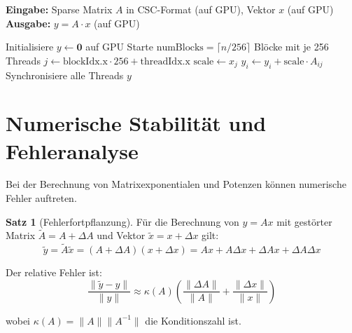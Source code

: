 ﻿\documentclass[a4paper,12pt]{report}
\theoremstyle{definition}
\newtheorem{satz}{Satz}
\begin{document}
	\begin{algorithm}[H]
		\caption{GPU-beschleunigte sparse Matrix-Vektor-Multiplikation}
		\label{alg:gpu-sparse-matvec}
		\textbf{Eingabe:} Sparse Matrix $A$ in CSC-Format (auf GPU), Vektor $x$ (auf GPU) \\
		\textbf{Ausgabe:} $y = A \cdot x$ (auf GPU)
		\begin{algorithmic}[1]
			\State Initialisiere $y \gets \mathbf{0}$ auf GPU
			\State Starte $\text{numBlocks} = \lceil n / 256 \rceil$ Blöcke mit je 256 Threads
			\State $j \gets \text{blockIdx.x} \cdot 256 + \text{threadIdx.x}$
			\State $\text{scale} \gets x_j$
			\State $y_i \gets y_i + \text{scale} \cdot A_{ij}$ 
			\EndFor
			\EndIf
			\EndFor
			\State Synchronisiere alle Threads
			\State \Return $y$
		\end{algorithmic}
	\end{algorithm}
	
	\section{Numerische Stabilität und Fehleranalyse}
	
	Bei der Berechnung von Matrixexponentialen und Potenzen können numerische Fehler auftreten.
	
	\begin{satz}[Fehlerfortpflanzung]
		Für die Berechnung von $y = A x$ mit gestörter Matrix $\tilde{A} = A + \Delta A$ und Vektor $\tilde{x} = x + \Delta x$ gilt:
		\[
		\tilde{y} = \tilde{A} \tilde{x} = (A + \Delta A)(x + \Delta x) = Ax + A \Delta x + \Delta A x + \Delta A \Delta x
		\]
		
		Der relative Fehler ist:
		\[
		\frac{\|\tilde{y} - y\|}{\|y\|} \approx \kappa(A) \left( \frac{\|\Delta A\|}{\|A\|} + \frac{\|\Delta x\|}{\|x\|} \right)
		\]
		
		wobei $\kappa(A) = \|A\| \|A^{-1}\|$ die Konditionszahl ist.
	\end{satz}
	
\end{document}
